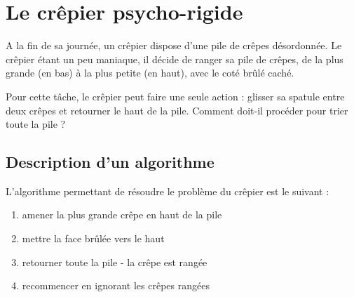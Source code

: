 \documentclass[a5paper,pagesize,DIV=14]{scrbook}
\begin{document}
\chapter*{Le crêpier psycho-rigide}

A la fin de sa journée, un crêpier dispose d'une pile de crêpes désordonnée. Le crêpier étant un peu maniaque, il décide de ranger sa pile de crêpes, de la plus grande (en bas) à la plus petite (en haut), avec le coté brûlé caché. 

\begin{center}
  
\end{center}

Pour cette tâche, le crêpier peut faire une seule action : glisser sa spatule entre deux crêpes et retourner le haut de la pile. Comment doit-il procéder pour trier toute la pile ?

\begin{center}
  
\end{center}



\newpage

\section*{Description d'un algorithme}

L'algorithme permettant de résoudre le problème du crêpier est le suivant :

\begin{enumerate}
\item amener la plus grande crêpe en haut de la pile
\item mettre la face brûlée vers le haut
\item retourner toute la pile - la crêpe est rangée
\item recommencer en ignorant les crêpes rangées
\end{enumerate}
\end{document}
